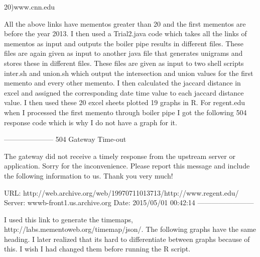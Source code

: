 \documentclass[12pt]{article} %
\begin{document}
20)www.cnn.edu

All the above links have mementos greater than 20 and the first mementos are before the year 2013.
I then used a Trial2.java code which takes all the links of mementos as input and outputs the boiler pipe results in different files. These files are again given as input to another java file that generates unigrams and stores these in different files. These files are given as input to two shell scripts inter.sh and union.sh which output the intersection and union values for the first memento and every other memento. \cite{inter}I then calculated the jaccard distance in excel and assigned the corresponding date time value to each jaccard distance value. I then used these 20 excel sheets plotted 19 graphs in R. For regent.edu when I processed the first memento through boiler pipe I got the following 504 response code which is why I do not have a graph for it.

---------------------
504 Gateway Time-out

The gateway did not receive a timely response from the upstream server or application. Sorry for the inconvenience.
Please report this message and include the following information to us.
Thank you very much!

URL:	http://web.archive.org/web/19970711013713/http://www.regent.edu/
Server:	wwwb-front1.us.archive.org
Date:	2015/05/01 00:42:14
------------------------

I used this link to generate the timemaps, http://labs.mementoweb.org/timemap/json/.
\cite{time}
The following graphs have the same heading. I later realized that its hard to differentiate between graphs because of this. I wish I had changed them before running the R script.
\end{document}
